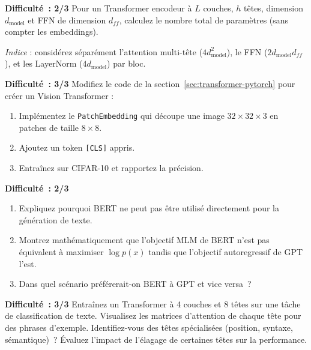 \begin{exercice}
\label{exo:transformer-params}
\textbf{Difficult\'e~: 2/3}
Pour un Transformer encodeur \`a $L$ couches, $h$ t\^etes, dimension $d_{\text{model}}$ et FFN de dimension $d_{ff}$, calculez le nombre total de param\`etres (sans compter les embeddings).

\emph{Indice} : consid\'erez s\'epar\'ement l'attention multi-t\^ete ($4 d_{\text{model}}^2$), le FFN ($2 d_{\text{model}} d_{ff}$), et les LayerNorm ($4 d_{\text{model}}$) par bloc.
\end{exercice}

\begin{exercice}
\label{exo:vit-impl}
\textbf{Difficult\'e~: 3/3}
Modifiez le code de la section~\ref{sec:transformer-pytorch} pour cr\'eer un Vision Transformer :
\begin{enumerate}
    \item Impl\'ementez le \texttt{PatchEmbedding} qui d\'ecoupe une image $32 \times 32 \times 3$ en patches de taille $8 \times 8$.
    \item Ajoutez un token \texttt{[CLS]} appris.
    \item Entra\^inez sur CIFAR-10 et rapportez la pr\'ecision.
\end{enumerate}
\end{exercice}

\begin{exercice}
\label{exo:bert-vs-gpt}
\textbf{Difficult\'e~: 2/3}
\begin{enumerate}
    \item Expliquez pourquoi BERT ne peut pas \^etre utilis\'e directement pour la g\'en\'eration de texte.
    \item Montrez math\'ematiquement que l'objectif MLM de BERT n'est pas \'equivalent \`a maximiser $\log p(x)$ tandis que l'objectif autoregressif de GPT l'est.
    \item Dans quel sc\'enario pr\'ef\'ererait-on BERT \`a GPT et vice versa~?
\end{enumerate}
\end{exercice}

\begin{exercice}
\label{exo:attention-heads}
\textbf{Difficult\'e~: 3/3}
Entra\^inez un Transformer \`a 4 couches et 8 t\^etes sur une t\^ache de classification de texte. Visualisez les matrices d'attention de chaque t\^ete pour des phrases d'exemple. Identifiez-vous des t\^etes sp\'ecialis\'ees (position, syntaxe, s\'emantique)~? \'Evaluez l'impact de l'\'elagage de certaines t\^etes sur la performance.
\end{exercice}
